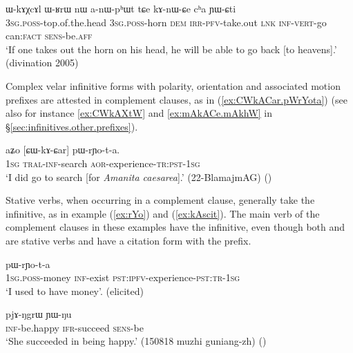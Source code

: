 \begin{exe}
\ex \label{ex:kAnWCe.YWCti}
 \gll  ɯ-kɤχcɤl ɯ-ʁrɯ nɯ a-nɯ-pʰɯt tɕe kɤ-nɯ-ɕe cʰa ɲɯ-ɕti \\
 \textsc{3sg}.\textsc{poss}-top.of.the.head \textsc{3sg}.\textsc{poss}-horn \textsc{dem} \textsc{irr}-\textsc{pfv}-take.out \textsc{lnk} \textsc{inf}-\textsc{vert}-go can:\textsc{fact} \textsc{sens}-be.\textsc{aff} \\
\glt `If one takes out the horn on his head, he will be able to go back [to heavens].' (divination 2005)
\end{exe}
 
 Complex velar infinitive forms with polarity, orientation and associated motion prefixes are attested in complement clauses, as in (\ref{ex:CWkACar.pWrYota}) (see also for instance \ref{ex:CWkAXtW} and \ref{ex:mAkACe.mAkhW} in §\ref{sec:infinitives.other.prefixes}).
 
\begin{exe}
\ex \label{ex:CWkACar.pWrYota}
 \gll aʑo [ɕɯ-kɤ-ɕar] pɯ-rɲo-t-a. \\
 \textsc{1sg} \textsc{tral}-\textsc{inf}-search \textsc{aor}-experience-\textsc{tr}:\textsc{pst}-\textsc{1sg} \\
 \glt `I did go to search [for \textit{Amanita caesarea}].'  (22-BlamajmAG) ()
\end{exe}

Stative verbs, when occurring in a complement clause, generally take the  infinitive, as in example  (\ref{ex:rYo}) and (\ref{ex:kAscit}). The main verb of the complement clauses in these examples have the  infinitive, even though both  and  are stative verbs and have a citation form with the  prefix.

\begin{exe}
\ex \label{ex:rYo}
\gll   [a-rŋɯl kɤ-tu] pɯ-rɲo-t-a \\
\textsc{1sg}.\textsc{poss}-money \textsc{inf}-exist \textsc{pst}:\textsc{ipfv}-experience-\textsc{pst}:\textsc{tr}-\textsc{1sg} \\
\glt `I used to have money'. (elicited)
\end{exe}

\begin{exe}
\ex \label{ex:kAscit}
 \gll  [kɤ-scit] pjɤ-ŋgrɯ ɲɯ-ŋu  \\
 \textsc{inf}-be.happy \textsc{ifr}-succeed \textsc{sens}-be \\
 \glt `She succeeded in being happy.' (150818 muzhi guniang-zh) ()
 \end{exe} 
 
